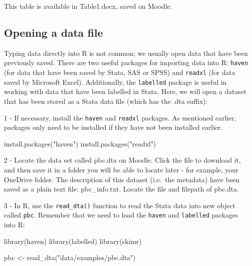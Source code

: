 \documentclass[
]{memoir}
\newenvironment{Shaded}{\begin{snugshade}}{\end{snugshade}}
\newcommand{\FunctionTok}[1]{\textcolor[rgb]{0.00,0.00,0.00}{#1}}
\newcommand{\NormalTok}[1]{#1}
\newcommand{\OtherTok}[1]{\textcolor[rgb]{0.56,0.35,0.01}{#1}}
\newcommand{\StringTok}[1]{\textcolor[rgb]{0.31,0.60,0.02}{#1}}
\begin{document}
This table is available in Table1.docx, saved on Moodle.

\hypertarget{opening-a-data-file}{%
\subsection{Opening a data file}\label{opening-a-data-file}}

Typing data directly into R is not common; we usually open data that have been previously saved. There are two useful packages for importing data into R: \texttt{haven} (for data that have been saved by Stata, SAS or SPSS) and \texttt{readxl} (for data saved by Microsoft Excel). Additionally, the \texttt{labelled} package is useful in working with data that have been labelled in Stata. Here, we will open a dataset that has been stored as a Stata data file (which has the .dta suffix):

1 - If necessary, install the \texttt{haven} and \texttt{readxl} packages. As mentioned earlier, packages only need to be installed if they have not been installed earlier.

\begin{Shaded}
\begin{Highlighting}[]
\FunctionTok{install.packages}\NormalTok{(}\StringTok{"haven"}\NormalTok{)}
\FunctionTok{install.packages}\NormalTok{(}\StringTok{"readxl"}\NormalTok{)}
\end{Highlighting}
\end{Shaded}

2 - Locate the data set called pbc.dta on Moodle. Click the file to download it, and then save it in a folder you will be able to locate later - for example, your OneDrive folder. The description of this dataset (i.e.~the metadata) have been saved as a plain text file: pbc\_info.txt. Locate the file and filepath of pbc.dta.

3 - In R, use the \texttt{read\_dta()} function to read the Stata data into new object called \texttt{pbc}. Remember that we need to load the \texttt{haven} and \texttt{labelled} packages into R:

\begin{Shaded}
\begin{Highlighting}[]
\FunctionTok{library}\NormalTok{(haven)}
\FunctionTok{library}\NormalTok{(labelled)}
\FunctionTok{library}\NormalTok{(skimr)}

\NormalTok{pbc }\OtherTok{\textless{}{-}} \FunctionTok{read\_dta}\NormalTok{(}\StringTok{"data/examples/pbc.dta"}\NormalTok{)}
\end{Highlighting}
\end{Shaded}
\end{document}
